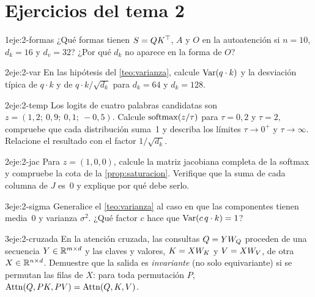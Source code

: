 \section*{Ejercicios del tema 2}

\begin{ejercicio}{1}{eje:2-formas}
¿Qué formas tienen $S=QK^{\top}$, $A$ y $O$ en la autoatención si $n=10$, $d_k=16$ y $d_v=32$? ¿Por qué $d_k$ no aparece en la forma de $O$?
\end{ejercicio}

\begin{ejercicio}{2}{eje:2-var}
En las hipótesis del \cref{teo:varianza}, calcule $\operatorname{Var}(q\cdot k)$ y la desviación típica de $q\cdot k$ y de $q\cdot k/\sqrt{d_k}$ para $d_k=64$ y $d_k=128$.
\end{ejercicio}

\begin{ejercicio}{2}{eje:2-temp}
Los logits de cuatro palabras candidatas son $z=(1{,}2;\allowbreak\ 0{,}9;\allowbreak\ 0{,}1;\allowbreak\ -0{,}5)$. Calcule $\operatorname{softmax}(z/\tau)$ para $\tau=0{,}2$ y $\tau=2$, compruebe que cada distribución suma~1 y describa los límites $\tau\to 0^{+}$ y $\tau\to\infty$. Relacione el resultado con el factor $1/\sqrt{d_k}$.
\end{ejercicio}

\begin{ejercicio}{2}{eje:2-jac}
Para $z=(1,0,0)$, calcule la matriz jacobiana completa de la softmax y compruebe la cota de la \cref{prop:saturacion}. Verifique que la suma de cada columna de $J$ es~0 y explique por qué debe serlo.
\end{ejercicio}

\begin{ejercicio}{3}{eje:2-sigma}
Generalice el \cref{teo:varianza} al caso en que las componentes tienen media~0 y varianza $\sigma^{2}$. ¿Qué factor $c$ hace que $\operatorname{Var}(c\,q\cdot k)=1$?
\end{ejercicio}

\begin{ejercicio}{3}{eje:2-cruzada}
En la atención cruzada, las consultas $Q=YW_{Q}$ proceden de una secuencia $Y\in\mathbb{R}^{m\times d}$ y las claves y valores, $K=XW_{K}$ y $V=XW_{V}$, de otra $X\in\mathbb{R}^{n\times d}$. Demuestre que la salida es \emph{invariante} (no solo equivariante) si se permutan las filas de $X$: para toda permutación $P$, $\operatorname{Attn}(Q,PK,PV)=\operatorname{Attn}(Q,K,V)$.
\end{ejercicio}
